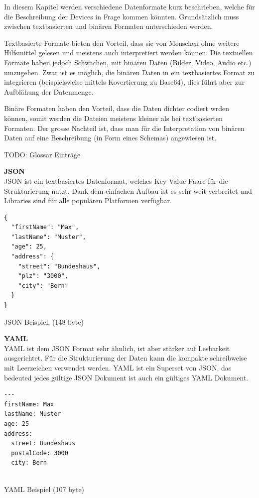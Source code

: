 In diesem Kapitel werden verschiedene Datenformate kurz beschrieben, welche für die Beschreibung der Devices in Frage kommen könnten. Grundsätzlich muss zwischen textbasierten und binären Formaten unterschieden werden.

Textbasierte Formate bieten den Vorteil, dass sie von Menschen ohne weitere Hilfsmittel gelesen und meistens auch interpretiert werden können. Die textuellen Formate haben jedoch Schwächen, mit binären Daten (Bilder, Video, Audio etc.) umzugehen. Zwar ist es möglich, die binären Daten in ein textbasiertes Format zu integrieren (beispielsweise mittels Kovertierung zu Base64), dies führt aber zur Aufblähung der Datenmenge.

Binäre Formaten haben den Vorteil, dass die Daten dichter codiert wrden können, somit werden die Dateien meistens kleiner als bei textbasierten Formaten. Der grosse Nachteil ist, dass man für die Interpretation von binären Daten auf eine Beschreibung (in Form eines Schemas) angewiesen ist.

TODO: Glossar Einträge

\textbf{JSON} \\
JSON ist ein textbasiertes Datenformat, welches Key-Value Paare für die Strukturierung nutzt. Dank dem einfachen Aufbau ist es sehr weit verbreitet und Libraries sind für alle populären Platformen verfügbar.

\begin{listing}[H]
\begin{verbatim}
{
  "firstName": "Max",
  "lastName": "Muster",
  "age": 25,
  "address": {
    "street": "Bundeshaus",
    "plz": "3000",
    "city": "Bern"
  }
}

\end{verbatim}
\caption{JSON Beispiel, (148 byte)}
\end{listing}


\textbf{YAML} \\ 
YAML ist dem JSON Format sehr ähnlich, ist aber stärker auf Lesbarkeit ausgerichtet. Für die Strukturierung der Daten kann die kompakte schreibweise mit Leerzeichen verwendet werden. 
YAML ist ein Superset von JSON, das bedeuted jedes gültige JSON Dokument ist auch ein gültiges YAML Dokument.

\begin{listing}[H]
\begin{verbatim}
---
firstName: Max
lastName: Muster
age: 25
address: 
  street: Bundeshaus
  postalCode: 3000
  city: Bern


\end{verbatim}
\caption{YAML Beispiel (107 byte)}
\end{listing}

